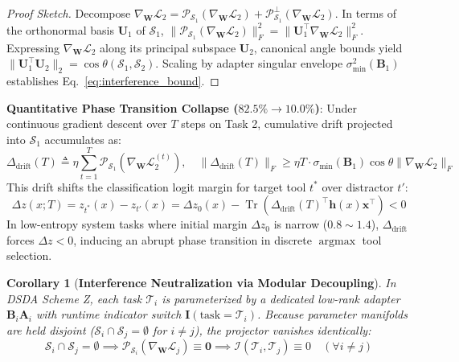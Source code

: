 \documentclass{article}
\newtheorem{corollary}{Corollary}[theorem]
\begin{document}
\begin{proof}[Proof Sketch]
Decompose $\nabla_{\mathbf{W}} \mathcal{L}_2 = \mathcal{P}_{\mathcal{S}_1}(\nabla_{\mathbf{W}} \mathcal{L}_2) + \mathcal{P}_{\mathcal{S}_1}^\perp(\nabla_{\mathbf{W}} \mathcal{L}_2)$. In terms of the orthonormal basis $\mathbf{U}_1$ of $\mathcal{S}_1$, $\|\mathcal{P}_{\mathcal{S}_1}(\nabla_{\mathbf{W}} \mathcal{L}_2)\|_F^2 = \|\mathbf{U}_1^\top \nabla_{\mathbf{W}} \mathcal{L}_2\|_F^2$. Expressing $\nabla_{\mathbf{W}} \mathcal{L}_2$ along its principal subspace $\mathbf{U}_2$, canonical angle bounds yield $\|\mathbf{U}_1^\top \mathbf{U}_2\|_2 = \cos \theta(\mathcal{S}_1, \mathcal{S}_2)$. Scaling by adapter singular envelope $\sigma_{\min}^2(\mathbf{B}_1)$ establishes Eq.~\eqref{eq:interference_bound}.
\end{proof}

\noindent \textbf{Quantitative Phase Transition Collapse ($82.5\% \to 10.0\%$)}: Under continuous gradient descent over $T$ steps on Task 2, cumulative drift projected into $\mathcal{S}_1$ accumulates as:
\begin{equation}
\label{eq:drift_integration}
\Delta_{\text{drift}}(T) \triangleq \eta \sum_{t=1}^T \mathcal{P}_{\mathcal{S}_1}\left(\nabla_{\mathbf{W}} \mathcal{L}_2^{(t)}\right), \quad \|\Delta_{\text{drift}}(T)\|_F \ge \eta T \cdot \sigma_{\min}(\mathbf{B}_1) \cos \theta \|\nabla_{\mathbf{W}} \mathcal{L}_2\|_F
\end{equation}
This drift shifts the classification logit margin for target tool $t^*$ over distractor $t'$:
\begin{equation}
\label{eq:margin_shift}
\Delta z(x; T) = z_{t^*}(x) - z_{t'}(x) = \Delta z_0(x) - \operatorname{Tr}\left( \Delta_{\text{drift}}(T)^\top \mathbf{h}(x)\mathbf{x}^\top \right) < 0
\end{equation}
In low-entropy system tasks where initial margin $\Delta z_0$ is narrow ($0.8\sim1.4$), $\Delta_{\text{drift}}$ forces $\Delta z < 0$, inducing an abrupt phase transition in discrete $\operatorname{argmax}$ tool selection.

\begin{corollary}[\textbf{Interference Neutralization via Modular Decoupling}]
In DSDA Scheme Z, each task $\mathcal{T}_i$ is parameterized by a dedicated low-rank adapter $\mathbf{B}_i \mathbf{A}_i$ with runtime indicator switch $\mathbf{I}(\text{task} = \mathcal{T}_i)$. Because parameter manifolds are held disjoint ($\mathcal{S}_i \cap \mathcal{S}_j = \emptyset$ for $i \neq j$), the projector vanishes identically:
\begin{equation}
\label{eq:zero_interference}
\mathcal{S}_i \cap \mathcal{S}_j = \emptyset \implies \mathcal{P}_{\mathcal{S}_i}\left(\nabla_{\mathbf{W}} \mathcal{L}_j\right) \equiv \mathbf{0} \implies \mathcal{I}(\mathcal{T}_i, \mathcal{T}_j) \equiv 0 \quad (\forall i \neq j)
\end{equation}
\end{corollary}
\end{document}
